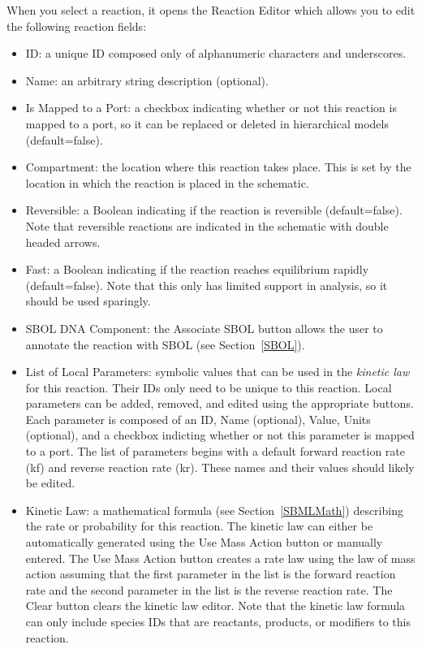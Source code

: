 \documentclass[titlepage,11pt]{article}
\begin{document}
When you select a reaction, it opens the Reaction Editor which allows you to edit the following reaction fields:
\begin{itemize}
\item ID: a unique ID composed only of alphanumeric characters and underscores.
\item Name: an arbitrary string description (optional).
\item Is Mapped to a Port: a checkbox indicating whether or not this reaction is mapped to a port, so it can be replaced or deleted in hierarchical models (default=false).
\item Compartment: the location where this reaction takes place.  This is set by the location in which the reaction is placed in the schematic.
\item Reversible: a Boolean indicating if the reaction is reversible (default=false).  Note that reversible reactions are indicated in the schematic with double headed arrows.
\item Fast: a Boolean indicating if the reaction reaches equilibrium rapidly (default=false).  Note that this only has limited support in analysis, so it should be used sparingly.
\item SBOL DNA Component: the Associate SBOL button allows the user to annotate the reaction with SBOL (see Section~\ref{SBOL}).
\item List of Local Parameters: symbolic values that can be used in the \emph{kinetic law} for this reaction.  Their IDs only need to be unique to this reaction.  Local parameters can be added, removed, and edited using the appropriate buttons.  Each parameter is composed of an ID, Name (optional), Value, Units (optional), and a checkbox indicting whether or not this parameter is mapped to a port.  The list of parameters begins with a default forward reaction rate (kf) and reverse reaction rate (kr).  These names and their values should likely be edited. 
\item Kinetic Law: a mathematical formula (see Section~\ref{SBMLMath}) describing the rate or probability for this reaction.  The kinetic law can either be automatically generated using the Use Mass Action button or manually entered.  The Use Mass Action button creates a rate law using the law of mass action assuming that the first parameter in the list is the forward reaction rate and the second parameter in the list is the reverse reaction rate.  
The Clear button clears the kinetic law editor.  Note that the kinetic law formula can only include species IDs that are reactants, products, or modifiers to this reaction.
\end{itemize}
\end{document}
